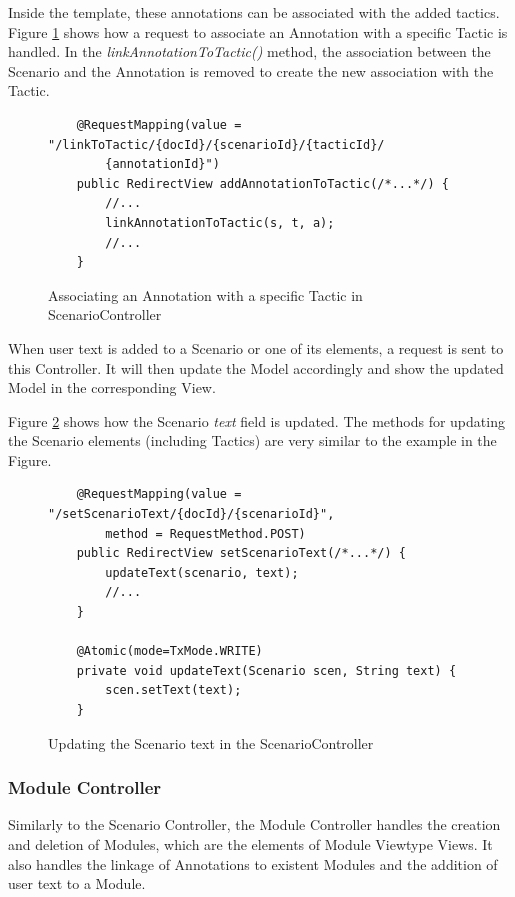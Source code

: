 \documentclass{llncs}
\begin{document}
Inside the template, these annotations can be associated with the added tactics. Figure \ref{figure:scenarioControllerLinkToTactic} shows how a request to associate an Annotation with a specific Tactic is handled. In the \textit{linkAnnotationToTactic()} method, the association between the Scenario and the Annotation is removed to create the new association with the Tactic.

\begin{figure}
\lstset{style=customjava}
\begin{lstlisting}
	@RequestMapping(value = "/linkToTactic/{docId}/{scenarioId}/{tacticId}/
		{annotationId}")
	public RedirectView addAnnotationToTactic(/*...*/) {
		//...
		linkAnnotationToTactic(s, t, a);
		//...
	}
\end{lstlisting}
\caption{Associating an Annotation with a specific Tactic in ScenarioController}
\label{figure:scenarioControllerLinkToTactic}
\end{figure}

When user text is added to a Scenario or one of its elements, a request is sent to this Controller. It will then update the Model accordingly and show the updated Model in the corresponding View.

Figure \ref{figure:scenarioControllerText} shows how the Scenario \textit{text} field is updated. The methods for updating the Scenario elements (including Tactics) are very similar to the example in the Figure.

\begin{figure}
\lstset{style=customjava}
\begin{lstlisting}
	@RequestMapping(value = "/setScenarioText/{docId}/{scenarioId}", 
		method = RequestMethod.POST)
	public RedirectView setScenarioText(/*...*/) {
		updateText(scenario, text);
		//...
	}
	
	@Atomic(mode=TxMode.WRITE)
	private void updateText(Scenario scen, String text) {
		scen.setText(text);
	}	
\end{lstlisting}
\caption{Updating the Scenario text in the ScenarioController}
\label{figure:scenarioControllerText}
\end{figure}

\subsubsection{Module Controller}

Similarly to the Scenario Controller, the Module Controller handles the creation and deletion of Modules, which are the elements of Module Viewtype Views. It also handles the linkage of Annotations to existent Modules and the addition of user text to a Module. 
\end{document}
